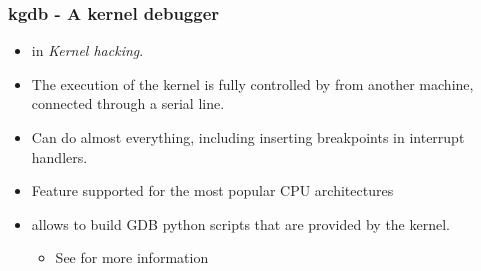 
\begin{frame}
  \frametitle{kgdb - A kernel debugger}
  \begin{itemize}
  \item {} in {\em Kernel hacking}.
  \item The execution of the kernel is fully controlled by 
    from another machine, connected through a serial line.
  \item Can do almost everything, including inserting breakpoints in
    interrupt handlers.
  \item Feature supported for the most popular CPU architectures
  \item {} allows to build GDB python scripts that are
    provided by the kernel.
  \begin{itemize}
    \item See  for more information
  \end{itemize}
  \end{itemize}
\end{frame}

